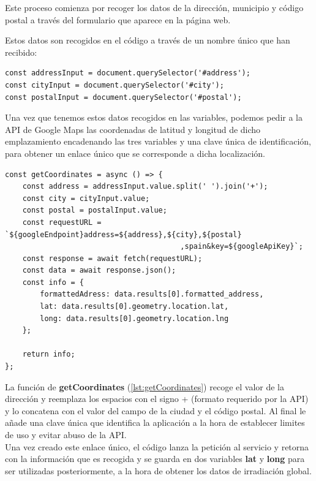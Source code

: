 \documentclass[11pt]{report}
\begin{document}
Este proceso comienza por recoger los datos de la dirección, municipio y código postal a través del formulario que aparece en la página web.

Estos datos son recogidos en el código a través de un nombre único que han recibido:\\
\begin{lstlisting}[style=ES6, caption={Variables correspondientes a los tres campos}]
const addressInput = document.querySelector('#address');
const cityInput = document.querySelector('#city');
const postalInput = document.querySelector('#postal');
\end{lstlisting}

Una vez que tenemos estos datos recogidos en las variables, podemos pedir a la API de Google Maps las coordenadas de latitud y longitud de dicho emplazamiento encadenando las tres variables y una clave única de identificación,  para obtener un enlace único que se corresponde a dicha localización.\\

\begin{lstlisting}[style=ES6, label={lst:getCoordinates}, caption={Función encargada de solicitar los datos a la API}]
const getCoordinates = async () => {
	const address = addressInput.value.split(' ').join('+');
	const city = cityInput.value;
	const postal = postalInput.value;
	const requestURL = `${googleEndpoint}address=${address},${city},${postal}
										,spain&key=${googleApiKey}`;
	const response = await fetch(requestURL);
	const data = await response.json();
	const info = {
		formattedAdress: data.results[0].formatted_address,
		lat: data.results[0].geometry.location.lat,
		long: data.results[0].geometry.location.lng
	};

	return info;
};
\end{lstlisting}

La función de \textbf{getCoordinates} (\ref{lst:getCoordinates}) recoge el valor de la dirección y reemplaza los espacios con el signo + (formato requerido por la API) y lo concatena con el valor del campo de la ciudad y el código postal. Al final le añade una clave única que identifica la aplicación a la hora de establecer limites de uso y evitar abuso de la API.\\

Una vez creado este enlace único, el código lanza la petición al servicio y retorna con la información que es recogida y se guarda en dos variables \textbf{lat} y \textbf{long} para ser utilizadas posteriormente, a la hora de obtener los datos de irradiación global.
\end{document}
